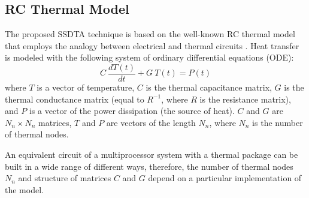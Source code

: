 \subsection{RC Thermal Model}
The proposed SSDTA technique is based on the well-known RC thermal model that employs the analogy between electrical and thermal circuits \cite{kreith2000}. Heat transfer is modeled with the following system of ordinary differential equations (ODE):
\begin{equation} \label{eq:thermal-ode}
  C \: \frac{dT(t)}{dt} + G \: T(t) = P(t)
\end{equation}
where $T$ is a vector of temperature, $C$ is the thermal capacitance matrix, $G$ is the thermal conductance matrix (equal to $R^{-1}$, where $R$ is the resistance matrix), and $P$ is a vector of the power dissipation (the source of heat). $C$ and $G$ are $N_n \times N_n$ matrices, $T$ and $P$ are vectors of the length $N_n$, where $N_n$ is the number of thermal nodes.

An equivalent circuit of a multiprocessor system with a thermal package can be built in a wide range of different ways, therefore, the number of thermal nodes $N_n$ and structure of matrices $C$ and $G$ depend on a particular implementation of the model.
